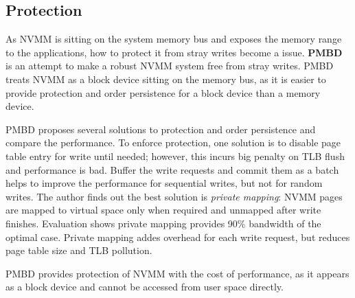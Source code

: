 
\subsection{Protection} 
\label{sec:protection}

As NVMM is sitting on the system memory bus and exposes the memory range
to the applications, how to protect it from stray writes become a issue.
\textbf{PMBD}~\cite{PMBD}
is an attempt to make a robust NVMM system free from stray writes.
PMBD treats NVMM as a block device sitting on the memory bus, as it is
easier to provide protection and order persistence for
a block device than a memory device.

PMBD proposes several solutions to protection and order persistence and
compare the performance. To enforce protection, one solution is to disable page
table entry for write until needed; however, this incurs big penalty on
TLB flush and performance is bad. Buffer the write requests and commit
them as a batch helps to improve the performance for sequential writes,
but not for random writes. The author finds out the best solution is 
\emph{private mapping}: NVMM pages are mapped to virtual space only when
required and unmapped after write finishes. Evaluation shows private
mapping provides 90\% bandwidth of the optimal case. Private mapping
addes overhead for each write request, but reduces page table size and
TLB pollution.


PMBD provides protection of NVMM with the cost of performance, as it appears
as a block device and cannot be accessed from user space directly.


